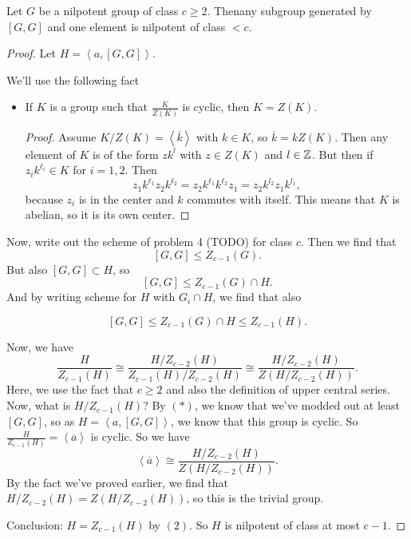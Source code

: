 \begin{lemma}
    Let $G$ be a nilpotent group of class $ c\ge 2$.
    Thenany subgroup generated by $[G, G]$ and one element
    is nilpotent of class $<c$.
\end{lemma}
\begin{proof}
    Let $H = \left<a, [G, G] \right>$.

    We'll use the following fact
    \begin{itemize}
        \item If $K$ is a group such that  $\frac{K}{Z(K)}$ is cyclic, then $K = Z(K)$. 
            \begin{proof}
                Assume $K / Z(K) = \left<\overline{k} \right>$ with $k \in K$, so $\overline{k} = k Z(K)$.
                Then any element of $K$ is of the form  $zk^{l}$ with $z \in Z(K)$ and $l \in \mathbb{Z}$.
                But then if $z_i k^{\ell_i} \in K$ for $i = 1, 2$.
                Then
                 \[
                z_1 k^{\ell_1} z_2 k^{\ell_2} = 
                z_2 k^{\ell_1} k^{\ell_2} z_1 = z_2 k^{l_2} z_1 k^{l_1}
                ,\] 
                because $z_i$ is in the center and $k$ commutes with itself.
                This means that $K$ is abelian, so it is its own center.
            \end{proof}
    \end{itemize}

    Now, write out the scheme of problem 4 (TODO) for class $c$.
    Then we find that
    \[
        [G, G] \le  Z_{c-1}(G)
    .\] 
    But also $[G, G] \subset H$, so
    \[
        [G, G] \le Z_{c-1}(G) \cap H
    .\] 
    And by writing scheme for $H$ with $G_i \cap H$, we find that also 

    \[
        [G, G] \le Z_{c-1}(G) \cap H \le Z_{c-1}(H) \tag{$*$}
    .\] 

    Now, we have
    \[
        \frac{H}{Z_{c-1}(H)}
        \cong  \frac{H / Z_{c-2}(H)}{ Z_{c-1}(H) / Z_{c-2}(H) }
        \cong \frac{H / Z_{c-2}(H)}{ Z (H / Z_{c-2}(H)) } \tag{2}
    .\] 
    Here, we use the fact that $c \ge 2$ and also the definition of upper central series.
    Now, what is $H / Z_{c-1}(H)$? By $(*)$, we know that we've modded out at least  $[G, G]$, so as  $H = \left<a, [G, G] \right>$, we know that this group is cyclic.
    So $\frac{H}{Z_{c-1}(H)} = \left<\overline{a} \right>$ is cyclic.
    So we have
    \[
    \left<\overline{a} \right>
    \cong \frac{H / Z_{c-2}(H)}{ Z (H / Z_{c-2}(H)) }
    .\] 
    By the fact we've proved earlier, we find that $H / Z_{c-2}(H) = Z(H / Z_{c-2}(H))$, so this is the trivial group.

    Conclusion: $H = Z_{c-1}(H)$ by $(2)$.
    So  $H$ is nilpotent of class at most  $c-1$.
\end{proof}

